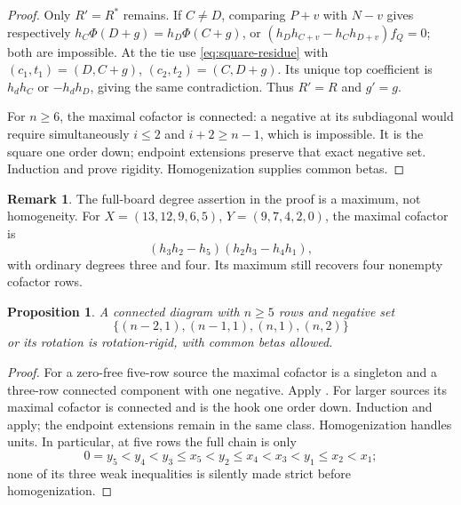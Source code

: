 \documentclass[11pt,a4paper]{amsart}
\numberwithin{equation}{section}
\theoremstyle{plain}
\newtheorem{proposition}[theorem]{Proposition}
\theoremstyle{definition}
\newtheorem{remark}[theorem]{Remark}
\begin{document}
\begin{proof}
Only \(R'=R^*\) remains.  If \(C\ne D\), comparing
\(P+v\) with \(N-v\) gives respectively
\(h_C\Phi(D+g)=h_D\Phi(C+g)\), or
\((h_Dh_{C+v}-h_Ch_{D+v})f_Q=0\); both are impossible.
At the tie use \eqref{eq:square-residue} with
\((c_1,t_1)=(D,C+g)\), \((c_2,t_2)=(C,D+g)\).
Its unique top coefficient is \(h_dh_C\) or \(-h_dh_D\), giving the
same contradiction.  Thus \(R'=R\) and \(g'=g\).

For \(n\ge6\), the maximal cofactor is connected: a negative at its
subdiagonal would require simultaneously \(i\le2\) and
\(i+2\ge n-1\), which is impossible.  It is the square one order down;
endpoint extensions preserve that exact negative set.  Induction and
 prove rigidity.  Homogenization supplies common betas.
\end{proof}

\begin{remark}\label{rem:square-degree}
The full-board degree assertion in the proof is a maximum, not homogeneity.
For \(X=(13,12,9,6,5)\), \(Y=(9,7,4,2,0)\), the maximal cofactor is
\[
 (h_3h_2-h_5)(h_2h_3-h_4h_1),
\]
with ordinary degrees three and four.  Its maximum still recovers four
nonempty cofactor rows.
\end{remark}

\begin{proposition}\label{prop:hook}
A connected diagram with \(n\ge5\) rows and negative set
\[
 \{(n-2,1),(n-1,1),(n,1),(n,2)\}
\]
or its rotation is rotation-rigid, with common betas allowed.
\end{proposition}

\begin{proof}
For a zero-free five-row source the maximal cofactor is a singleton and a
three-row connected component with one negative.  Apply
.  For larger sources its maximal cofactor
is connected and is the hook one order down.  Induction and
 apply; the endpoint extensions remain in the same class.
Homogenization handles units.  In particular, at five rows the full chain
is only
\[
 0=y_5<y_4<y_3\le x_5<y_2\le x_4<x_3<y_1\le x_2<x_1;
\]
none of its three weak inequalities is silently made strict before
homogenization.
\end{proof}
\end{document}

